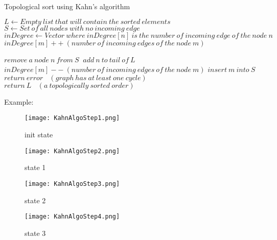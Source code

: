 \documentclass[12pt]{article}
\begin{document}
\begin{algorithm}

  \caption{Topological sort using Kahn's algorithm  \cite{1}}
  
  \begin{algorithmic}[1]
    \Statex
        \State $L \gets Empty\ list\ that\ will\ contain\ the\ sorted\ elements $
        \State $S \gets Set\ of\ all\ nodes\ with\ no\ incoming\ edge\ $
        \State $inDegree \gets Vector\ where\ inDegree[n]\ is\ the\ number\ of\ incoming\ edge\ of\ the\ node\ n$
                \State $inDegree[m]++\  (number\ of\ incoming\ edges\ of\ the\ node\ m) $
            \EndFor
        \EndFor
        
            \State $remove\ a\ node\ n\ from\ S\ $
            \State $add\ n\ to\ tail\ of\ L\ $
                 \State $inDegree[m]--\  (number\ of\ incoming\ edges\ of\ the\ node\ m) $
                    \State $insert\ m\ into\ S$
                \EndIf
            \EndFor
        \EndWhile
            \State $return\ error\  \ \ \ (graph\ has\ at\ least\ one\ cycle)$
        \Else
        \State $return\ L\  \ \ \ (a\ topologically\ sorted\ order)$
        \EndIf
  \end{algorithmic}
 
\end{algorithm}

Example:
\begin{figure}[H]
\centering
\texttt{[image: KahnAlgoStep1.png]}
\caption{init state}
\end{figure}

\begin{figure}[H]
\centering
\texttt{[image: KahnAlgoStep2.png]}
\caption{state 1}
\end{figure}

\begin{figure}[H]
\centering
\texttt{[image: KahnAlgoStep3.png]}
\caption{state 2}
\end{figure}

\begin{figure}[H]
\centering
\texttt{[image: KahnAlgoStep4.png]}
\caption{state 3}
\end{figure}
    
\end{document}
